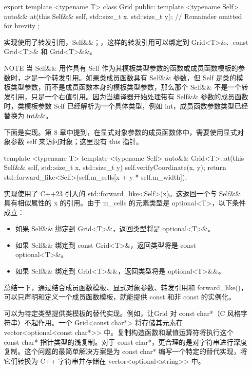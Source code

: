 \begin{cpp}
export template <typename T>
class Grid
{
    public:
        template <typename Self>
        auto&& at(this Self&& self, std::size_t x, std::size_t y);
        // Remainder omitted for brevity
};
\end{cpp}

实现使用了转发引用，Self\&\&；，这样的转发引用可以绑定到 Grid<T>\&、const Grid<T>\& 和 Grid<T>\&\&。

\begin{myNotic}{NOTE}
当 Self\&\& 用作具有 Self 作为其模板类型参数的函数或成员函数模板的参数时，才是一个转发引用。如果类成员函数具有 Self\&\& 参数，但 Self 是类的模板类型参数，而不是成员函数本身的模板类型参数，那么那个 Self\&\& 不是一个转发引用，只是一个右值引用。因为当编译器开始处理带有 Self\&\& 参数的成员函数时，类模板参数 Self 已经解析为一个具体类型，例如 int，成员函数参数类型已经替换为 int\&\&。
\end{myNotic}

下面是实现。第 8 章中提到，在显式对象参数的成员函数体中，需要使用显式对象参数 self 来访问对象；这里没有 this 指针。

\begin{cpp}
template <typename T>
template <typename Self>
auto&& Grid<T>::at(this Self&& self, std::size_t x, std::size_t y)
{
    self.verifyCoordinate(x, y);
    return std::forward_like<Self>(self.m_cells[x + y * self.m_width]);
}
\end{cpp}

实现使用了 C++23 引入的 std::forward\_like<Self>(x)。这返回一个与 Self\&\& 具有相似属性的 x 的引用。由于 m\_cells 的元素类型是 optional<T>，以下条件成立：

\begin{itemize}
\item
如果 Self\&\& 绑定到 Grid<T>\&，返回类型将是 optional<T>\&。

\item
如果 Self\&\& 绑定到 const Grid<T>\&，返回类型将是 const optional<T>\&。

\item
如果 Self\&\& 绑定到 Grid<T>\&\&，返回类型将是 optional<T>\&\&。
\end{itemize}

总结一下，通过结合成员函数模板、显式对象参数、转发引用和 forward\_like()，可以只声明和定义一个成员函数模板，就能提供 const 和非 const 的实例化。


可以为特定类型提供类模板的替代实现。例如，让Grid 对 const char*（C 风格字符串）不起作用。一个 Grid<const char*> 将存储其元素在 vector<optional<const char*>{}> 中。复制构造函数和赋值运算符将执行这个 const char* 指针类型的浅复制。对于 const char*，更合理的是对字符串进行深度复制。这个问题的最简单解决方案是为 const char* 编写一个特定的替代实现，将它们转换为 C++ 字符串并存储在 vector<optional<string>{}> 中。

